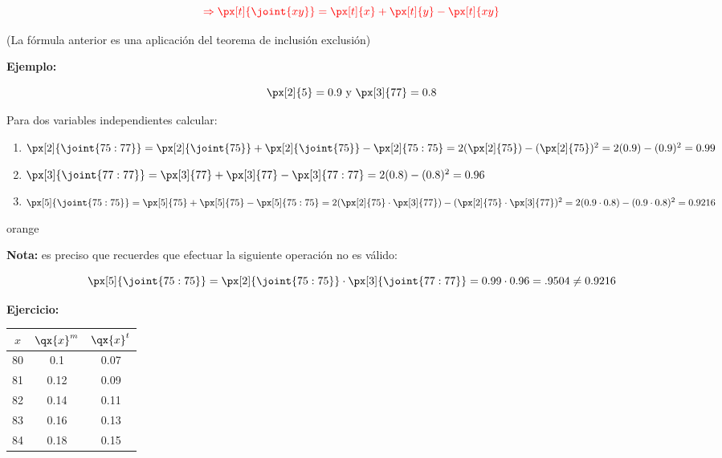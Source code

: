 \documentclass[12pt, a4paper, footinclude=true]{scrbook}
\newenvironment{advertencia}{
	\begin{calloutbase}{orange}
	}{
	\end{calloutbase}
}
\begin{document}
$${\color{red}\Rightarrow \px[t]{\joint{xy}} = \px[t]{x} + \px[t]{y} - \px[t]{xy}}$$


\begin{center}
	(La fórmula anterior es una aplicación del teorema de inclusión exclusión)
\end{center}

\vspace{0.2cm}

\textbf{Ejemplo:}

\vspace{0.2cm}
	
	\[
		\px[2]{5} = 0{.}9 \text{ y } 	\px[3]{77} = 0{.}8
	\]

Para dos variables independientes calcular: 
	
	\begin{enumerate}[label = \alph*)]
		\item $\px[2]{\joint{75:77}} = \px[2]{\joint{75}} + \px[2]{\joint{75}} - \px[2]{75:75} = 2(\px[2]{75}) - (\px[2]{75})^2 = 2(0.9) - (0.9)^2 = 0.99$
		\item $\px[3]{\joint{77:77}} = \px[3]{77} + \px[3]{77} - \px[3]{77:77} = 2(0.8) - (0.8)^2 = 0.96$
		\item $\px[5]{\joint{75:75}} = \px[5]{75} + \px[5]{75} - \px[5]{75:75} = 2(\px[2]{75} \cdot \px[3]{77}) - (\px[2]{75} \cdot \px[3]{77})^2 = 2(0.9 \cdot 0.8) - (0.9 \cdot 0.8)^2 = 0.9216$
	\end{enumerate}

\begin{advertencia}
	
	\textbf{Nota:} es preciso que recuerdes que efectuar la siguiente operación no es válido: 
	
	\[
		\px[5]{\joint{75:75}} = \px[2]{\joint{75:75}} \cdot \px[3]{\joint{77:77}} = 
		0.99 \cdot 0.96 = 
		.9504 
		\neq 0.9216	
	\]
\end{advertencia}

\vspace{0.2cm}

\textbf{Ejercicio:}

\vspace{0.2cm}

\begin{center}
	\begin{tabular}{c|c|c}
		
		$x$ & $\qx{x}^m$ & $\qx{x}^t$  \\
		\hline
		80 & 0.1 & 0.07   \\
		81 & 0.12 & 0.09  \\
		82 & 0.14 & 0.11   \\
		83 & 0.16 & 0.13   \\
		84 & 0.18 & 0.15   \\
		
	\end{tabular}
\end{center}
\end{document}
